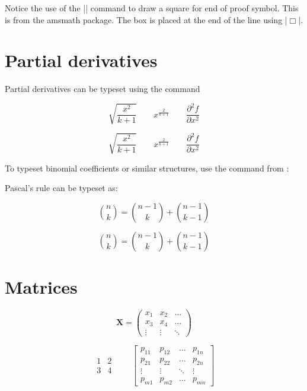 Notice the use of the |\Box| command to draw a square for  end of proof symbol. This is from the amsmath package. The box is placed at the end of the line using |\hfill $\Box$|.



\section{Partial derivatives}

Partial derivatives can be typeset using the \latex{} command 
\begin{teXX}
\[
 \sqrt{\frac{x^2}{k+1}}\qquad
  x^\frac{2}{k+1}\qquad
  \frac{\partial^2f}
  {\partial x^2}
\]
\end{teXX}




\begin{equation*}
\sqrt{\frac{x^2}{k+1}}\qquad
x^\frac{2}{k+1}\qquad
\frac{\partial^2f}
{\partial x^2}
\end{equation*}



To typeset binomial coefficients or similar structures, use the command
 from :

Pascal's rule can be typeset as:

\begin{shaded}
\begin{teXX}
\[
\binom{n}{k} =\binom{n-1}{k}
+ \binom{n-1}{k-1}
\]
\end{teXX}
\[
\binom{n}{k} =\binom{n-1}{k}
+ \binom{n-1}{k-1}
\]
\end{shaded}

\clearpage




\section{Matrices}

\begin{equation*}
\mathbf{X} = \left(
\begin{array}{ccc}
x_1 & x_2 & \ldots \\
x_3 & x_4 & \ldots \\
\vdots & \vdots & \ddots
\end{array} \right)
\end{equation*}

\begin{equation*}
\begin{matrix}
1 & 2 \\
3 & 4
\end{matrix} \qquad
\begin{bmatrix}
p_{11} & p_{12} & \ldots
& p_{1n} \\
p_{21} & p_{22} & \ldots
& p_{2n} \\
\vdots & \vdots & \ddots
& \vdots \\
p_{m1} & p_{m2} & \ldots
& p_{mn}
\end{bmatrix}
\end{equation*}


